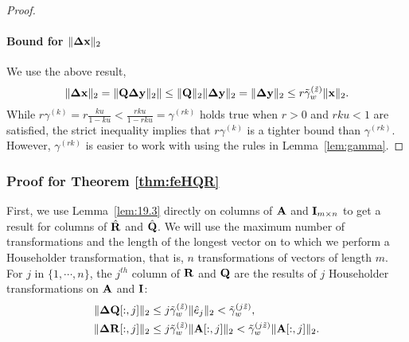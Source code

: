 \begin{proof}
	\paragraph{Bound for $\|\mathbf{\Delta x}\|_2$}
	We use the above result,
	\begin{equation}
	\|\mathbf{\Delta x}\|_2 = \|\mathbf{Q \Delta y}\|_2\| \leq \|\mathbf{Q}\|_2\|\mathbf{\Delta y}\|_2 = \|\mathbf{\Delta y}\|_2 \leq  r\tilde{\gamma}_w^{(\tilde{z})}\|\mathbf{x}\|_2.
	\end{equation}
	While $r\gamma^{(k)} = r\frac{ku}{1-ku} < \frac{rku}{1-rku} =\gamma^{(rk)}$ holds true when $r>0$ and $rku< 1$ are satisfied, the strict inequality implies that $r\gamma^{(k)}$ is a tighter bound than $\gamma^{(rk)}$.
	However, $\gamma^{(rk)}$ is easier to work with using the rules in Lemma~\ref{lem:gamma}.
\end{proof}

\subsubsection{Proof for Theorem \ref{thm:feHQR}}
First, we use Lemma~\ref{lem:19.3} directly on columns of $\mathbf{A}$ and $\mathbf{I}_{m\times n}$ to get a result for columns of $\hat{\mathbf{R}}$ and $\hat{\mathbf{Q}}$.
We will use the maximum number of transformations and the length of the longest vector on to which we perform a Householder transformation, that is, $n$ transformations of vectors of length $m$. 
For $j$ in $\{1, \cdots, n\}$, the $j^{th}$ column of $\mathbf{R}$ and $\mathbf{Q}$ are the results of $j$ Householder transformations on $\mathbf{A}$ and $\mathbf{I}$:
\begin{align}
\|\mathbf{\Delta Q}[:,j]\|_2 &\leq j\tilde{\gamma}_w^{(\tilde{z})}\|\hat{e}_{j}\|_2 < \tilde{\gamma}_w^{(j\tilde{z})}, \\
\|\mathbf{\Delta R}[:,j]\|_2 &\leq j\tilde{\gamma}_w^{(\tilde{z})}\|\mathbf{A}[:,j]\|_2 < \tilde{\gamma}_w^{(j\tilde{z})}\|\mathbf{A}[:,j]\|_2.
\end{align}


